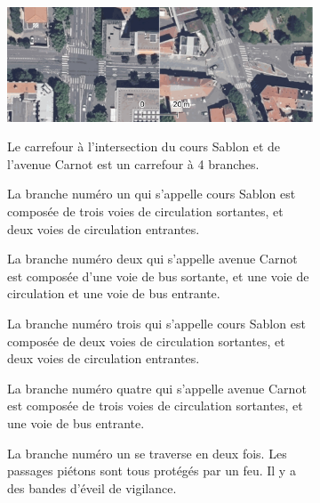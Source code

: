 \begin{figure}
    \begin{subfigure}[t]{\linewidth}
        \centering
        \includegraphics[width=\linewidth]{images/evaluation/ortho_carrefours_eval.png}
    \end{subfigure}
    \begin{subfigure}[t]{\linewidth}
        \centering
        \begin{minipage}[t]{0.49\linewidth}
            \vspace{0pt}
            \scriptsize
            Le carrefour à l'intersection du cours Sablon et de l'avenue Carnot est un carrefour à 4 branches.

            \vspace{5pt}

            La branche numéro un qui s'appelle cours Sablon est composée de trois voies de circulation sortantes, et deux voies de circulation entrantes.

            \vspace{5pt}

            La branche numéro deux qui s'appelle avenue Carnot est composée d'une voie de bus sortante, et une voie de circulation et une voie de bus entrante.

            \vspace{5pt}

            La branche numéro trois qui s'appelle cours Sablon est composée de deux voies de circulation sortantes, et deux voies de circulation entrantes.

            \vspace{5pt}

            La branche numéro quatre qui s'appelle avenue Carnot est composée de trois voies de circulation sortantes, et une voie de bus entrante.

            \vspace{5pt}

            La branche numéro un se traverse en deux fois. Les passages piétons sont tous protégés par un feu. Il y a des bandes d'éveil de vigilance.


\end{minipage}
\end{subfigure}
\end{figure}
